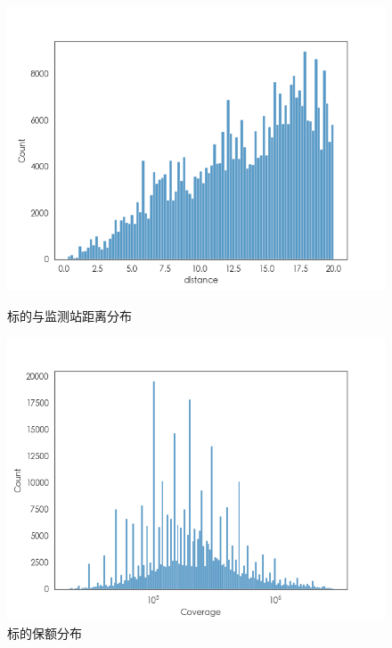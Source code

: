 \begin{figure}[H]
    \centering
    \begin{minipage}{0.48\linewidth}
        \includegraphics[width=\linewidth]{lib/img/olsdistance.png}
        \caption{标的与监测站距离分布}\label{fig:dis}
    \end{minipage}
    \begin{minipage}{0.48\linewidth}
        \includegraphics[width=\linewidth]{lib/img/coverage.png}
        \caption{标的保额分布}\label{fig:coverage}
    \end{minipage}
    \begin{minipage}{0.48\linewidth}

\end{minipage}
\end{figure}
